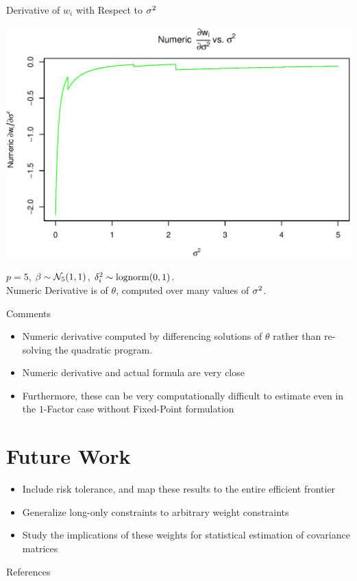\documentclass[11pt,leqno]{beamer}
\begin{document}
\begin{frame}{Derivative of $w_i$ with Respect to $\sigma^2$}
\begin{centering}
\includegraphics[scale=.5]{sigma_deriva_numeric.eps}
\end{centering}
$p=5$, $\beta \sim \mathcal{N}_5(1,1)$, $\delta_i^2\sim \mathrm{lognorm}(0,1)$. \\ 
\footnotesize{Numeric Derivative is of $\theta$, computed over many values of $\sigma^2$.}
\end{frame}

\begin{frame}{Comments}
\begin{itemize}
\item Numeric derivative computed by differencing solutions of $\theta$ rather than re-solving the quadratic program.
\item Numeric derivative and actual formula are very close
\item Furthermore, these can be very computationally difficult to estimate even in the $1$-Factor case without Fixed-Point formulation
\end{itemize}

\end{frame}

\section{Future Work}
\begin{frame}
\begin{itemize}
\item Include risk tolerance, and map these results to the entire efficient frontier
\item Generalize long-only constraints to arbitrary weight constraints
\item Study the implications of these weights for statistical estimation of covariance matrices
\end{itemize}
\end{frame}


\begin{frame}[allowframebreaks]{References}



\end{frame}
\end{document}

